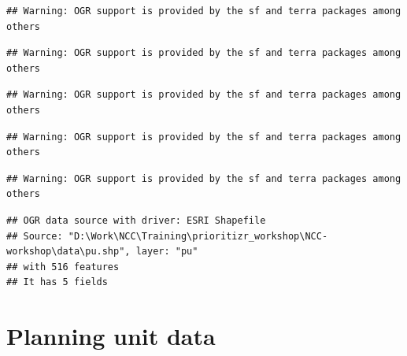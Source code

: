 \documentclass[
  12pt,
]{book}
\newenvironment{Shaded}{\begin{snugshade}}{\end{snugshade}}
\newcommand{\CommentTok}[1]{\textcolor[rgb]{0.56,0.35,0.01}{\textit{#1}}}
\newcommand{\FunctionTok}[1]{\textcolor[rgb]{0.00,0.00,0.00}{#1}}
\newcommand{\NormalTok}[1]{#1}
\newcommand{\OtherTok}[1]{\textcolor[rgb]{0.56,0.35,0.01}{#1}}
\newcommand{\SpecialCharTok}[1]{\textcolor[rgb]{0.00,0.00,0.00}{#1}}
\newcommand{\StringTok}[1]{\textcolor[rgb]{0.31,0.60,0.02}{#1}}
\begin{document}
\begin{verbatim}
## Warning: OGR support is provided by the sf and terra packages among others
\end{verbatim}

\begin{verbatim}
## Warning: OGR support is provided by the sf and terra packages among others
\end{verbatim}

\begin{verbatim}
## Warning: OGR support is provided by the sf and terra packages among others
\end{verbatim}

\begin{verbatim}
## Warning: OGR support is provided by the sf and terra packages among others
\end{verbatim}

\begin{verbatim}
## Warning: OGR support is provided by the sf and terra packages among others
\end{verbatim}

\begin{verbatim}
## OGR data source with driver: ESRI Shapefile 
## Source: "D:\Work\NCC\Training\prioritizr_workshop\NCC-workshop\data\pu.shp", layer: "pu"
## with 516 features
## It has 5 fields
\end{verbatim}

\begin{Shaded}
\end{Shaded}

\clearpage

\hypertarget{planning-unit-data}{%
\section{Planning unit data}\label{planning-unit-data}}
\end{document}
